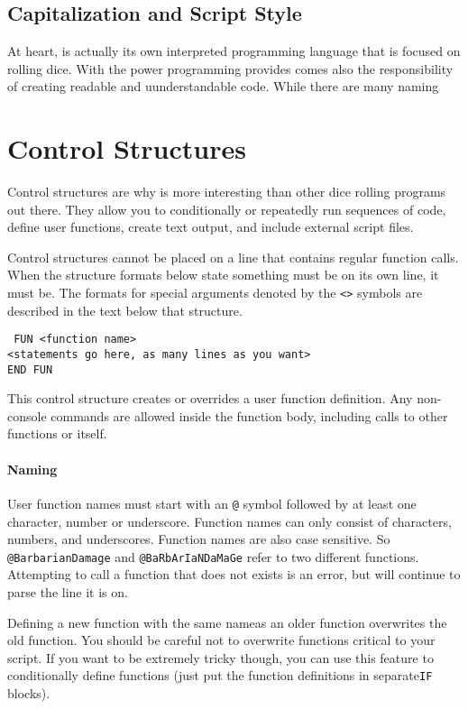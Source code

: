 \subsection{Capitalization and Script Style}
\label{codingStyle}
At heart, \progLogo is actually its own interpreted programming language that
is focused on rolling dice. With the power programming provides comes also
the responsibility of creating readable and uunderstandable code. While there
are many naming 

\section{Control Structures}
\label{controlStructures}
Control structures are why \progLogo is more interesting than other
dice rolling programs out there. They allow you to conditionally or repeatedly
run sequences of code, define user functions, create text output, and include
external script files.

Control structures cannot be placed on a line that contains regular function
calls. When the structure formats below state something must be on its own line,
it must be. The formats for special arguments denoted by the \texttt{<>} symbols
are described in the text below that structure.

\noindent\texttt{%
FUN <function name>\\
<statements go here, as many lines as you want>\\
END FUN}

This control structure creates or overrides a user function definition. Any
non-console commands are allowed inside the function body, including calls to
other functions or itself.

\paragraph*{Naming\\}
\hspace*{\parindent}User function names must start with an \texttt{@} symbol
followed by at least
one character, number or underscore. Function names can only consist of
characters, numbers, and underscores. Function names are also case sensitive.
So \texttt{@BarbarianDamage} and \texttt{@BaRbArIaNDaMaGe} refer to two
different functions. Attempting to call a function that does not exists is an
error, but \progLogo  will continue to parse the line it is on.

Defining a new function with the same nameas an older function overwrites the
old function. You should be careful not to overwrite functions critical to
your script. If you want to be extremely tricky though, you can use this
feature to conditionally define functions (just put the function definitions
in separate\texttt{IF} blocks).

